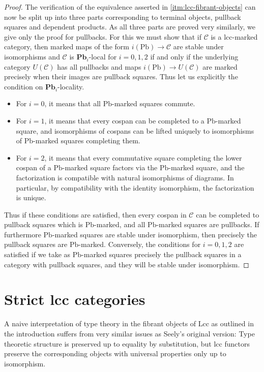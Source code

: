 \documentclass[a4paper]{article}
\theoremstyle{remark}
\theoremstyle{definition}
\begin{document}
\begin{proof}
  The verification of the equivalence asserted in \ref{itm:lcc-fibrant-objects} can now be split up into three parts corresponding to terminal objects, pullback squares and dependent products.
  As all three parts are proved very similarly, we give only the proof for pullbacks.
  For this we must show that if $\mathcal{C}$ is a lcc-marked category, then marked maps of the form $i(\mathrm{Pb}) \rightarrow \mathcal{C}$ are stable under isomorphisms and $\mathcal{C}$ is $\mathbf{Pb}_i$-local for $i = 0, 1, 2$ if and only if the underlying category $U(\mathcal{C})$ has all pullbacks and maps $i(\mathrm{Pb}) \rightarrow U(\mathcal{C})$ are marked precisely when their images are pullback squares.
  Thus let us explicitly the condition on $\mathbf{Pb}_i$-locality.
  \begin{itemize}
    \item
      For $i = 0$, it means that all $\mathrm{Pb}$-marked squares commute.
    \item
      For $i = 1$, it means that every cospan can be completed to a $\mathrm{Pb}$-marked square, and isomorphisms of cospans can be lifted uniquely to isomorphisms of $\mathrm{Pb}$-marked squares completing them.
    \item
      For $i = 2$, it means that every commutative square completing the lower cospan of a $\mathrm{Pb}$-marked square factors via the $\mathrm{Pb}$-marked square, and the factorization is compatible with natural isomorphisms of diagrams.
      In particular, by compatibility with the identity isomorphism, the factorization is unique.
  \end{itemize}
  Thus if these conditions are satisfied, then every cospan in $\mathcal{C}$ can be completed to pullback squares which is $\mathrm{Pb}$-marked, and all $\mathrm{Pb}$-marked squares are pullbacks.
  If furthermore $\mathrm{Pb}$-marked squares are stable under isomorphism, then precisely the pullback squares are $\mathrm{Pb}$-marked.
  Conversely, the conditions for $i = 0, 1, 2$ are satisfied if we take as $\mathrm{Pb}$-marked squares precisely the pullback squares in a category with pullback squares, and they will be stable under isomorphism.
\end{proof}

\section{Strict lcc categories}
\label{sec:slcc}

A naive interpretation of type theory in the fibrant objects of $\mathrm{Lcc}$ as outlined in the introduction suffers from very similar issues as Seely's original version:
Type theoretic structure is preserved up to equality by substitution, but lcc functors preserve the corresponding objects with universal properties only up to isomorphism.
\end{document}
